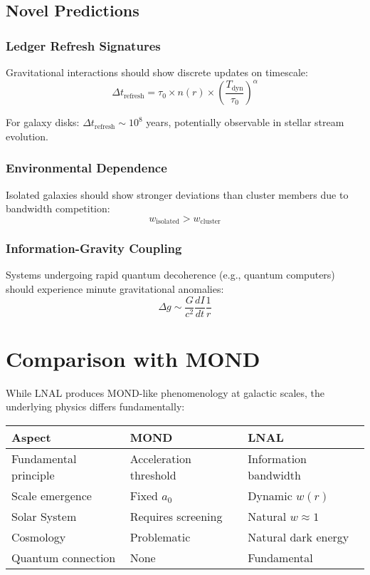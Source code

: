 \documentclass[12pt]{article}
\begin{document}
\subsection{Novel Predictions}

\subsubsection{Ledger Refresh Signatures}
Gravitational interactions should show discrete updates on timescale:
\begin{equation}
\Delta t_{\text{refresh}} = \tau_0 \times n(r) \times \left(\frac{T_{\text{dyn}}}{\tau_0}\right)^\alpha
\end{equation}

For galaxy disks: $\Delta t_{\text{refresh}} \sim 10^8$ years, potentially observable in stellar stream evolution.

\subsubsection{Environmental Dependence}
Isolated galaxies should show stronger deviations than cluster members due to bandwidth competition:
\begin{equation}
w_{\text{isolated}} > w_{\text{cluster}}
\end{equation}

\subsubsection{Information-Gravity Coupling}
Systems undergoing rapid quantum decoherence (e.g., quantum computers) should experience minute gravitational anomalies:
\begin{equation}
\Delta g \sim \frac{G}{c^2} \frac{dI}{dt} \frac{1}{r}
\end{equation}

\section{Comparison with MOND}

While LNAL produces MOND-like phenomenology at galactic scales, the underlying physics differs fundamentally:

\begin{table}[h]
\centering
\begin{tabular}{|l|l|l|}
\hline
Aspect & MOND & LNAL \\
\hline
Fundamental principle & Acceleration threshold & Information bandwidth \\
Scale emergence & Fixed $a_0$ & Dynamic $w(r)$ \\
Solar System & Requires screening & Natural $w \approx 1$ \\
Cosmology & Problematic & Natural dark energy \\
Quantum connection & None & Fundamental \\
\hline
\end{tabular}
\end{table}
\end{document}
